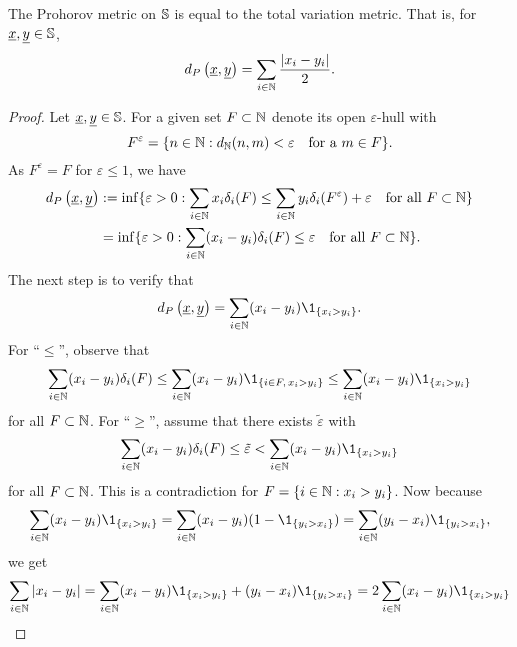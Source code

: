 \begin{Lemma}
The Prohorov metric on $\mathbb{S}$ is equal to the total variation metric. That is, 
for $\underline{x}, \underline{y} \in \mathbb{S}$,
\[
d_P\left( \underline{x}, \underline{y} \right)
= \sum_{i \in \mathbb{N}}\frac{|x_i - y_i|}{2}.
\]
\end{Lemma}
\begin{proof}
Let $\underline{x}, \underline{y} \in \mathbb{S}$. For a given set $F \subset \mathbb{N}$ denote
its open $\varepsilon$-hull with
\[
F^\varepsilon = \{ n \in \mathbb{N} : d_{\mathbb{N}}(n,m) < \varepsilon \quad \text{for a } m \in F \}.
\]
As $F^\varepsilon = F$ for $\varepsilon \leq 1$, we have
\begin{align*}
d_P\left( \underline{x}, \underline{y} \right)
&:= \inf \{ \varepsilon > 0 :
\sum_{i \in \mathbb{N}} x_i \delta_i(F)
\leq  \sum_{i \in \mathbb{N}} y_i \delta_i(F^\varepsilon)+\varepsilon
\quad \text{for all } F \subset \mathbb{N}
\} \\
&= \inf \{ \varepsilon > 0 :
\sum_{i \in \mathbb{N}} (x_i - y_i) \delta_i(F)
\leq  \varepsilon
\quad \text{for all } F \subset \mathbb{N}
\}.
\end{align*}
The next step is to verify that 
\begin{align*}
d_P\left( \Vector{x}, \Vector{y} \right) 
= \sum_{i \in \N} (x_i - y_i) \1_{\left\{ x_i > y_i \right\}}.
\end{align*}
For ``$\leq$'', observe that
\begin{align*}
\sum_{i \in \N} (x_i - y_i) \delta_i(F)
\leq \sum_{i \in \N} (x_i - y_i) \1_{\left\{ i \in F, \, x_i > y_i \right\}}
\leq \sum_{i \in \N} (x_i - y_i) \1_{\left\{ x_i > y_i \right\}}
\end{align*}
for all $F \subset \mathbb{N}$. For ``$\geq$'', assume that there exists
$\tilde{\varepsilon}$ with
\[
\sum_{i \in \N} (x_i - y_i) \delta_i(F)
\leq \tilde{\varepsilon}
< \sum_{i \in \N} (x_i - y_i) \1_{\left\{ x_i > y_i \right\}}
\]
for all $F \subset \mathbb{N}$. This is a contradiction for $F = \{ i \in \mathbb{N} : x_i > y_i \}$.
Now because
\begin{align*}
\sum_{i \in \N} (x_i - y_i) \1_{\left\{ x_i > y_i \right\}}
= \sum_{i \in \N} (x_i - y_i) (1 - \1_{\left\{ y_i > x_i \right\}})
= \sum_{i \in \N} (y_i - x_i) \1_{\left\{ y_i > x_i \right\}},
\end{align*}
we get
\begin{align*}
\sum_{i \in \N}|x_i - y_i| = \sum_{i \in \N} (x_i - y_i) \1_{\left\{ x_i > y_i \right\}} + (y_i -
x_i) \1_{\left\{ y_i > x_i \right\}} = 2 \sum_{i \in \N} (x_i - y_i) \1_{\left\{ x_i > y_i \right\}} 
\end{align*}
\end{proof}

